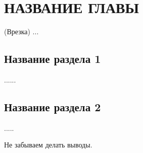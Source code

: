 \chapter{НАЗВАНИЕ ГЛАВЫ}\label{chap2}


(Врезка) ...

\section{Название раздела 1}\label{2sec:problem-formulation}

......


\section{Название раздела 2}\label{2sec:xxx} %

.....

\bigskip

Не забываем делать выводы.